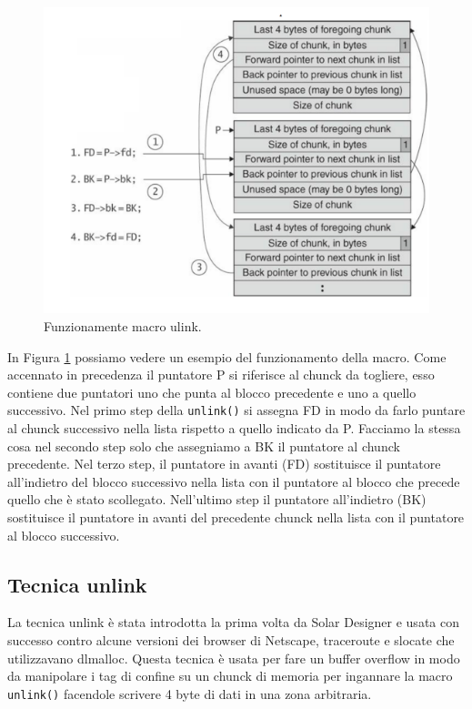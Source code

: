 \begin{figure}[H] 
	\centering
    \includegraphics[width=12cm, keepaspectratio]{santini/img/cap_4/ulink.png}
	\caption{Funzionamente macro ulink.}\label{fig:ulink}
\end{figure}

In Figura \ref{fig:ulink} possiamo vedere un esempio del funzionamento della macro. Come accennato in precedenza il puntatore P si riferisce al chunck da togliere, esso contiene due puntatori uno che punta al blocco precedente e uno a quello successivo. Nel primo step della \verb|unlink()| si assegna FD in modo da farlo puntare al chunck successivo nella lista rispetto a quello indicato da P. Facciamo la stessa cosa nel secondo step solo che assegniamo a BK il puntatore al chunck precedente. Nel terzo step, il puntatore in avanti (FD)  sostituisce il puntatore all'indietro del blocco successivo nella lista con il puntatore al blocco che precede quello che è stato scollegato. Nell'ultimo step il puntatore all'indietro (BK) sostituisce il puntatore in avanti del precedente chunck nella lista con il puntatore al blocco successivo.

\subsection{Tecnica unlink}
La tecnica unlink è stata introdotta la prima volta da Solar Designer e usata con successo contro alcune versioni dei browser di Netscape, traceroute e slocate che utilizzavano dlmalloc. Questa tecnica è usata per fare un buffer overflow in modo da manipolare i tag di confine su un chunck di memoria per ingannare la macro \verb|unlink()| facendole scrivere 4 byte di dati in una zona arbitraria. 

